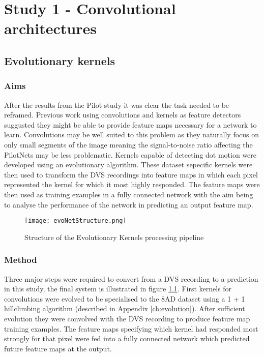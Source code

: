 \chapter{Study 1 - Convolutional architectures}
\label{ch:convolutions}

\section{Evolutionary kernels}

\subsection{Aims}
After the results from the Pilot study it was clear the task needed to be reframed.
Previous work using convolutions and kernels as feature detectors suggusted they might be able to provide feature maps necessary for a network to learn.
Convolutions may be well suited to this problem as they naturally focus on only small segments of the image meaning the signal-to-noise ratio affecting the PilotNets may be less problematic. 
Kernels capable of detecting dot motion were developed using an evolutionary algorithm. 
These dataset sepecific kernels were then used to transform the DVS recordings into feature maps in which each pixel represented the kernel for which it most highly responded. 
The feature maps were then used as training examples in a fully connected network with the aim being to analyse the performance of the network in predicting an output feature map. 

\begin{figure}[h]
    \centering
    \texttt{[image: evoNetStructure.png]}
    \caption{Structure of the Evolutionary Kernels processing pipeline}
    \label{fig:evoNetStructure}
\end{figure}

\subsection{Method}
Three major steps were required to convert from a DVS recording to a prediction in this study, the final system is illustrated in figure \ref{fig:evoNetStructure}.
First kernels for convolutions were evolved to be specialised to the 8AD dataset using a 1 + 1 hillclimbing algorithm (described in Appendix \ref{ch:evolution}). 
After sufficient evolution they were convolved with the DVS recording to produce feature map training examples.
The feature maps specifying which kernel had responded most strongly for that pixel were fed into a fully connected network which predicted future feature maps at the output.  

